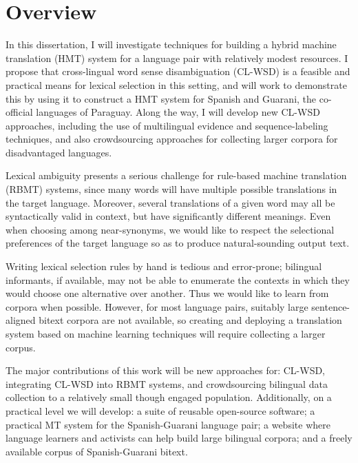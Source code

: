 \section{Overview}
In this dissertation, I will investigate techniques for building a hybrid
machine translation (HMT) system for a language pair with relatively modest
resources.
I propose that cross-lingual word sense disambiguation (CL-WSD) is a feasible
and practical means for lexical selection in this setting, and will work to
demonstrate this by using it to construct a HMT system for Spanish and Guarani,
the co-official languages of Paraguay.
Along the way, I will develop new CL-WSD approaches, including the use of
multilingual evidence and sequence-labeling techniques, and also crowdsourcing
approaches for collecting larger corpora for disadvantaged languages.

Lexical ambiguity presents a serious challenge for rule-based machine
translation (RBMT) systems, since many words will have multiple possible
translations in the target language. Moreover, several translations of a given
word may all be syntactically valid in context, but have significantly
different meanings. Even when choosing among near-synonyms, we would like to
respect the selectional preferences of the target language so as to produce
natural-sounding output text.

Writing lexical selection rules by hand is tedious and error-prone; bilingual
informants, if available, may not be able to enumerate the contexts in which
they would choose one alternative over another. Thus we would like to learn
from corpora when possible. However, for most language pairs, suitably large
sentence-aligned bitext corpora are not available, so creating and deploying a
translation system based on machine learning techniques will require collecting
a larger corpus.


The major contributions of this work will be new approaches for: CL-WSD,
integrating CL-WSD into RBMT systems, and crowdsourcing bilingual data
collection to a relatively small though engaged population.
Additionally, on a practical level we will develop: a suite of reusable
open-source software; a practical MT system for the Spanish-Guarani language
pair; a website where language learners and activists can help build large
bilingual corpora; and a freely available corpus of Spanish-Guarani bitext.

